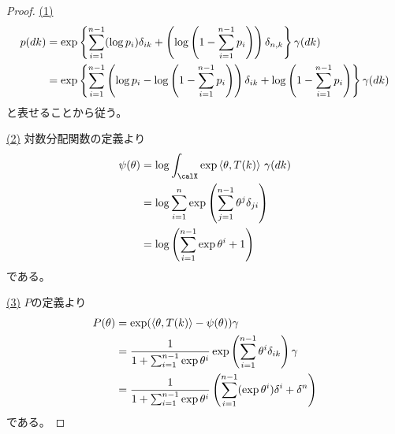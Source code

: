 \documentclass[report]{jlreq}
\begin{document}
\begin{proof}
    \uline{(1)} \quad
    \begin{alignat}{1}
        p(dk)
            &=
                \exp\left\{{
                    \sum_{i = 1}^{n - 1}
                        (\log p_i) \delta_{ik}
                    +
                    \left({
                        \log\left({
                            1 - \sum_{i = 1}^{n - 1} p_i
                        }\right)
                    }\right)
                    \delta_{n, k}
                }\right\}
                \gamma(dk)
                \\
            &=
                \exp\left\{{
                    \sum_{i = 1}^{n - 1}
                        \left({
                            \log p_i
                            -
                            \log\left({
                                1 - \sum_{i = 1}^{n - 1} p_i
                            }\right)
                        }\right)
                        \delta_{ik}
                    +
                    \log\left({
                        1 - \sum_{i = 1}^{n - 1} p_i
                    }\right)
                }\right\}
                \gamma(dk)
    \end{alignat}
    と表せることから従う。

    \uline{(2)} \quad
    対数分配関数の定義より
    \begin{alignat}{1}
        \psi(\theta)
            &=
                \log \int_\calX
                    \exp \myangle{\theta}{T(k)}
                    \, \gamma(dk)
                \\
            &=
                \log \sum_{i = 1}^n
                    \exp \myparen{
                        \sum_{j = 1}^{n - 1}
                            \theta^j
                            \delta_{ji}
                    }
                \\
            &=
                \log \myparen{
                    \sum_{i = 1}^{n - 1}
                        \exp \theta^i
                    + 1
                }
    \end{alignat}
    である。

    \uline{(3)} \quad
    $P$の定義より
    \begin{alignat}{1}
        P(\theta)
            &=
                \exp(\left\langle{\theta},{T(k)}\right\rangle - \psi(\theta)) \gamma
                \\
            &=
                \frac{
                    1
                }{
                    1 + \sum_{i = 1}^{n - 1} \exp\theta^i
                }
                \exp \left({
                    \sum_{i = 1}^{n - 1}
                        \theta^i
                        \delta_{ik}
                }\right)
                \gamma
                \\
            &=
                \frac{
                    1
                }{
                    1 + \sum_{i = 1}^{n - 1} \exp\theta^i
                }
                \left({
                    \sum_{i = 1}^{n - 1}
                        (\exp\theta^i)
                        \delta^i
                        +
                        \delta^n
                }\right)
    \end{alignat}
    である。


\end{proof}
\end{document}
